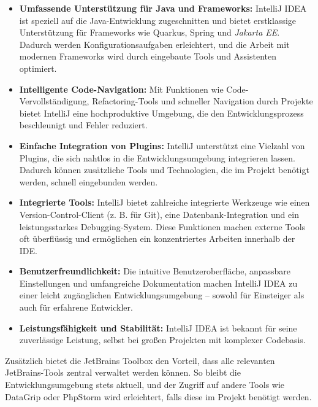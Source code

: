 \begin{itemize}
    \item 
    \textbf{Umfassende Unterstützung für Java und Frameworks: }
    IntelliJ IDEA ist speziell auf die Java-Entwicklung zugeschnitten und bietet erstklassige Unterstützung für Frameworks wie Quarkus, Spring und \textit{Jakarta EE}. Dadurch werden Konfigurationsaufgaben erleichtert, und die Arbeit mit modernen Frameworks wird durch eingebaute Tools und Assistenten optimiert.

    \item 
    \textbf{Intelligente Code-Navigation:} 
    Mit Funktionen wie Code-Vervollständigung, Refactoring-Tools und schneller Navigation durch Projekte bietet IntelliJ eine hochproduktive Umgebung, die den Entwicklungsprozess beschleunigt und Fehler reduziert.  

    \item 
    \textbf{Einfache Integration von Plugins: }
    IntelliJ unterstützt eine Vielzahl von Plugins, die sich nahtlos in die Entwicklungsumgebung integrieren lassen. Dadurch können zusätzliche Tools und Technologien, die im Projekt benötigt werden, schnell eingebunden werden.  

    \item 
    \textbf{Integrierte Tools:} 
    IntelliJ bietet zahlreiche integrierte Werkzeuge wie einen Version-Control-Client (z. B. für Git), eine Datenbank-Integration und ein leistungsstarkes Debugging-System. Diese Funktionen machen externe Tools oft überflüssig und ermöglichen ein konzentriertes Arbeiten innerhalb der IDE. 

    \item 
    \textbf{Benutzerfreundlichkeit:} 
    Die intuitive Benutzeroberfläche, anpassbare Einstellungen und umfangreiche Dokumentation machen IntelliJ IDEA zu einer leicht zugänglichen Entwicklungsumgebung – sowohl für Einsteiger als auch für erfahrene Entwickler. 

    \item 
    \textbf{Leistungsfähigkeit und Stabilität:} 
    IntelliJ IDEA ist bekannt für seine zuverlässige Leistung, selbst bei großen Projekten mit komplexer Codebasis.  
\end{itemize}

Zusätzlich bietet die JetBrains Toolbox den Vorteil, dass alle relevanten JetBrains-Tools zentral verwaltet werden können. So bleibt die Entwicklungsumgebung stets aktuell, und der Zugriff auf andere Tools wie DataGrip oder PhpStorm wird erleichtert, falls diese im Projekt benötigt werden.  


